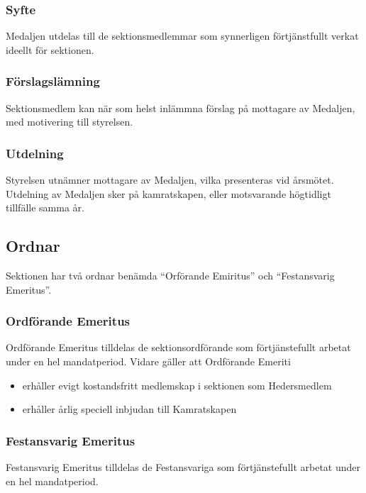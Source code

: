 \documentclass{../resources/dgovdoc}
\begin{document}
\subsubsection{Syfte}

Medaljen utdelas till de sektionsmedlemmar som synnerligen förtjänstfullt verkat ideellt för sektionen. 

\subsubsection{Förslagslämning}

Sektionsmedlem kan när som helst inlämmna förslag på mottagare av Medaljen, med motivering till styrelsen. 

\subsubsection{Utdelning}

Styrelsen utnämner mottagare av Medaljen, vilka presenteras vid årsmötet. Utdelning av Medaljen sker på kamratskapen, eller motsvarande högtidligt tillfälle samma år. 

\subsection{Ordnar}

Sektionen har två ordnar benämda ``Orförande Emiritus'' och ``Festansvarig Emeritus''.

\subsubsection{Ordförande Emeritus}

Ordförande Emeritus tilldelas de sektionsordförande som förtjänstefullt arbetat under en hel mandatperiod. 
    Vidare gäller att Ordförande Emeriti
\begin{itemize}
\item erhåller evigt kostandsfritt medlemskap i sektionen som Hedersmedlem
\item erhåller årlig speciell inbjudan till Kamratskapen
\end{itemize}

\subsubsection{Festansvarig Emeritus}

Festansvarig Emeritus tilldelas de Festansvariga som förtjänstefullt arbetat under en hel mandatperiod.
\end{document}
